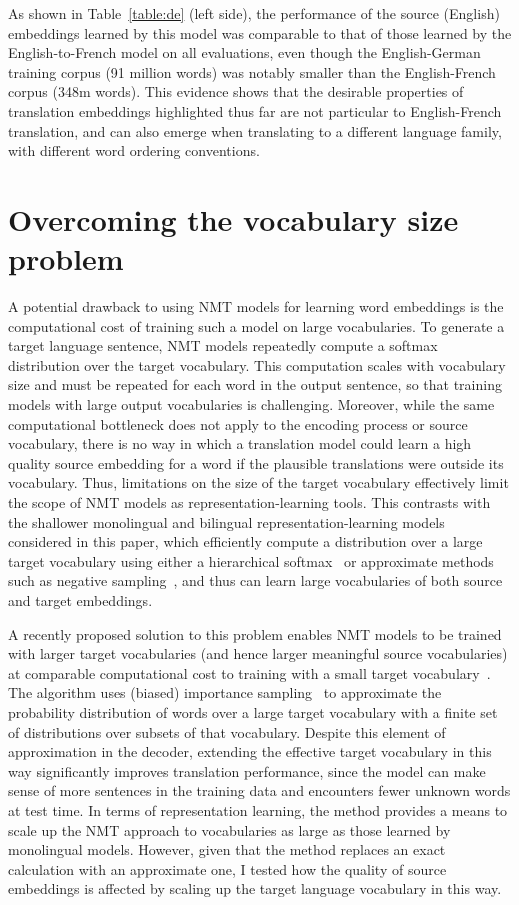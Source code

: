 As shown in Table~\ref{table:de} (left side), the performance of the source (English) embeddings learned by this model was comparable to that of those learned by the English-to-French model on all evaluations, even though the English-German training corpus (91 million words) was notably smaller than the English-French corpus (348m words). This evidence shows that the desirable properties of translation embeddings highlighted thus far are not particular to English-French translation, and can also emerge when translating to a different language family, with different word ordering conventions.     

\section{Overcoming the vocabulary size problem}

A potential drawback to using NMT models for learning word embeddings is the computational cost of training such a model on large vocabularies. To generate a target language sentence, NMT models repeatedly compute a softmax distribution over the target vocabulary. This computation scales with vocabulary size and must be repeated for each word in the output sentence, so that training models with large output vocabularies is challenging. Moreover, while the same computational bottleneck does not apply to the encoding process or source vocabulary, there is no way in which a translation model could learn a high quality source embedding for a word if the plausible translations were outside its vocabulary. Thus, limitations on the size of the target vocabulary effectively limit the scope of NMT models as representation-learning tools. This contrasts with the shallower monolingual and bilingual representation-learning models considered in this paper,  which efficiently compute a distribution over a large target vocabulary using either a hierarchical softmax~\citep{morin2005hierarchical} or approximate methods such as negative sampling~\citep{mikolov2013distributed,Hermann:2014:ICLR}, and thus can learn large vocabularies of both source and target embeddings.

A recently proposed solution to this problem enables NMT models to be trained with larger target vocabularies (and hence larger meaningful source vocabularies) at comparable computational cost to training with a small target vocabulary~\citep{Jean}. The algorithm uses (biased) importance sampling~\citep{Bengio+Senecal-2003-small} to approximate the probability distribution of words over a large target vocabulary with a finite set of distributions over subsets of that vocabulary. Despite this element of approximation in the decoder, extending the effective target vocabulary in this way significantly improves translation performance, since the model can make sense of more sentences in the training data and encounters fewer unknown words at test time. In terms of representation learning, the method provides a means to scale up the NMT approach to vocabularies as large as those learned by monolingual models. However, given that the method replaces an exact calculation with an approximate one, I tested how the quality of source embeddings is affected by scaling up the target language vocabulary in this way. 

